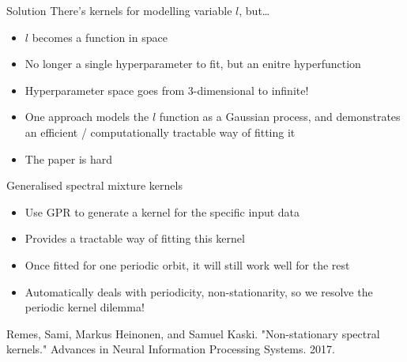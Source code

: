 \documentclass[presentation]{beamer}
\begin{document}
\begin{frame}[label={sec:org9112c1b}]{Solution}
There's kernels for modelling variable \(l\), but\ldots{}
\begin{itemize}
\item \(l\) becomes a function in space
\item No longer a single hyperparameter to fit, but an enitre hyperfunction
\item Hyperparameter space goes from 3-dimensional to infinite!
\item One approach models the \(l\) function as a Gaussian process, and demonstrates an efficient / computationally tractable way of fitting it
\item The paper is hard
\end{itemize}
\end{frame}

\begin{frame}[label={sec:orga094890}]{Generalised spectral mixture kernels}
\begin{itemize}
\item Use GPR to generate a kernel for the specific input data
\item Provides a tractable way of fitting this kernel
\item Once fitted for one periodic orbit, it will still work well for the rest
\item Automatically deals with periodicity, non-stationarity, so we resolve the periodic kernel dilemma!
\end{itemize}

Remes, Sami, Markus Heinonen, and Samuel Kaski. "Non-stationary spectral kernels." Advances in Neural Information Processing Systems. 2017.
\end{frame}
\end{document}
